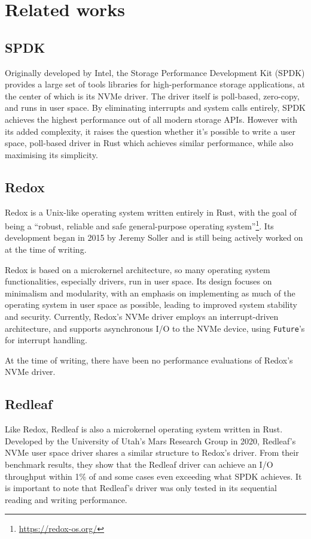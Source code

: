\chapter{Related works}\label{chapter:related}

\section{SPDK}
Originally developed by Intel, the Storage Performance Development Kit (SPDK) provides a large set of tools libraries for high-performance storage applications, at the center of which is its NVMe driver. The driver itself is poll-based, zero-copy, and runs in user space. By eliminating interrupts and system calls entirely, SPDK achieves the highest performance out of all modern storage APIs\cite{storage_api}. However with its added complexity, it raises the question whether it's possible to write a user space, poll-based driver in Rust which achieves similar performance, while also maximising its simplicity.

\section{Redox}
Redox is a Unix-like operating system written entirely in Rust, with the goal of being a ``robust, reliable and safe general-purpose operating system''\footnote{\url{https://redox-os.org/}}. Its development began in 2015 by Jeremy Soller and is still being actively worked on at the time of writing.

Redox is based on a microkernel architecture, so many operating system functionalities, especially drivers, run in user space. Its design focuses on minimalism and modularity, with an emphasis on implementing as much of the operating system in user space as possible, leading to improved system stability and security. Currently, Redox's NVMe driver employs an interrupt-driven architecture, and supports asynchronous I/O to the NVMe device, using \texttt{Future}'s for interrupt handling.

At the time of writing, there have been no performance evaluations of Redox's NVMe driver.

\section{Redleaf}
Like Redox, Redleaf is also a microkernel operating system written in Rust. Developed by the University of Utah's Mars Research Group in 2020, Redleaf's NVMe user space driver shares a similar structure to Redox's driver. From their benchmark results, they show that the Redleaf driver can achieve an I/O throughput within 1\% of and some cases even exceeding what SPDK achieves\cite{redleaf}. It is important to note that Redleaf's driver was only tested in its sequential reading and writing performance.

